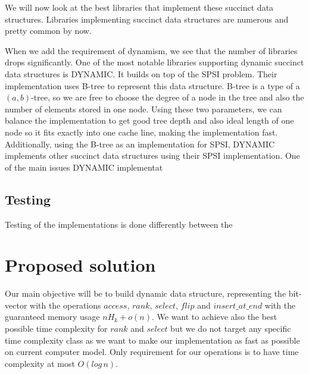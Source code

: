 We will now look at the best libraries that implement these succinct data structures. Libraries implementing succinct data structures are numerous and pretty common by now.

When we add the requirement of dynamism, we see that the number of libraries drops significantly. One of the most notable libraries supporting 
dynamic succinct data structures is DYNAMIC. It builds on top of the SPSI problem. Their implementation uses B-tree to represent this data structure. B-tree is a type of a $(a, b)$-tree, so we are free to choose the degree of a node in the tree and also the number of elements stored in one node. Using these two parameters, we can balance the implementation to get good tree depth and also ideal length of one node so it fits exactly into one cache line, making the implementation fast. Additionally, using the B-tree as an implementation for SPSI, DYNAMIC implements other succinct
data structures using their SPSI implementation. One of the main issues DYNAMIC implementat

\subsection{Testing}

Testing of the implementations is done differently between the 


\section{Proposed solution}

Our main objective will be to build dynamic data structure, representing the bit-vector with the operations $access$, $rank$, $select$, $flip$ and $insert\_at\_end$ with the guaranteed memory usage $nH_k+o(n)$. We want to achieve also the best possible time complexity for $rank$ and $select$ but we do not target any specific time complexity class as we want to make our implementation as fast as possible on current computer model. Only requirement for our operations is to have time complexity at most $O(log\,n)$.
